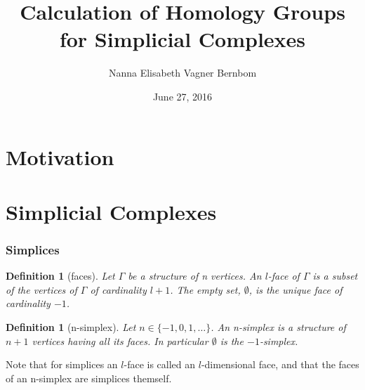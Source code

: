 \documentclass{beamer}
\newtheorem{mydef}[mythm]{Definition}
\begin{document}
\lstset{language=python,frame=single,breaklines=true}

\title{\textbf{Calculation of Homology Groups\\for Simplicial Complexes}}   
\author{Nanna Elisabeth Vagner Bernbom} 
\date{June 27, 2016} 

\frame{\titlepage} 

\section{Motivation}

\section{Simplicial Complexes} 
\begin{frame}
\frametitle{Simplices} 
\begin{mydef}[faces]
Let $\Gamma$ be a structure of n vertices. An $l$-face of $\Gamma$ is a subset of the vertices of $\Gamma$ of cardinality $l+1$. The empty set, $\emptyset$, is the unique face of cardinality $-1$.
\end{mydef}
\pause

\begin{mydef}[n-simplex]
Let $n\in\{-1,0,1,\dots\}$. An n-simplex is a structure of $n+1$ vertices having all its faces. In particular $\emptyset$ is the $-1$-simplex.
\end{mydef}\pause
Note that for simplices an $l$-face is called an $l$-dimensional face, and that the faces of an n-simplex are simplices themself.
\end{frame}

\end{document}
